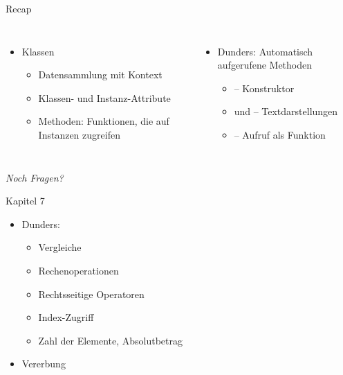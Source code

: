 
\begin{frame}[t,plain]
\titlepage
\end{frame}


\begin{frame}{Recap}
%
\begin{columns}[T]
\begin{itemize}
\item Klassen
	\begin{itemize}
	\item Datensammlung mit Kontext
	\item Klassen- und Instanz-Attribute
	\item Methoden: Funktionen, die auf Instanzen zugreifen
	\end{itemize}
\end{itemize}
%
\begin{itemize}
\item Dunders: Automatisch aufgerufene Methoden
	\begin{itemize}
	\item {} -- Konstruktor
	\item {} und  -- Textdarstellungen
	\item {} -- Aufruf als Funktion
	\end{itemize}
\end{itemize}

\end{columns}
%
\begin{center}
	\emph{Noch Fragen?}
\end{center}
%
\end{frame}


\begin{frame}[fragile]{Kapitel 7}
%
\begin{itemize}
\item Dunders: 
	\begin{itemize}
	\item Vergleiche
	\item Rechenoperationen
	\item Rechtsseitige Operatoren
	\item Index-Zugriff
	\item Zahl der Elemente, Absolutbetrag
	\end{itemize}
\item Vererbung
\end{itemize}
%
\end{frame}

